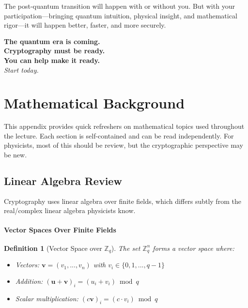 \documentclass[11pt,a4paper]{article}
\newtheorem{definition}{Definition}
\begin{document}
The post-quantum transition will happen with or without you. But with your participation—bringing quantum intuition, physical insight, and mathematical rigor—it will happen better, faster, and more securely.

\begin{center}
\Large
\textbf{The quantum era is coming.}\\[0.5em]
\textbf{Cryptography must be ready.}\\[0.5em]
\textbf{You can help make it ready.}\\[1em]
\textit{Start today.}
\end{center}

\appendix

\appendix

\section{Mathematical Background}
\label{app:math}

This appendix provides quick refreshers on mathematical topics used throughout the lecture. Each section is self-contained and can be read independently. For physicists, most of this should be review, but the cryptographic perspective may be new.

\subsection{Linear Algebra Review}
\label{app:linear-algebra}

Cryptography uses linear algebra over finite fields, which differs subtly from the real/complex linear algebra physicists know.

\paragraph{Vector Spaces Over Finite Fields}

\begin{definition}[Vector Space over $\mathbb{Z}_q$]
The set $\mathbb{Z}_q^n$ forms a vector space where:
\begin{itemize}
    \item Vectors: $\mathbf{v} = (v_1, ..., v_n)$ with $v_i \in \{0, 1, ..., q-1\}$
    \item Addition: $(\mathbf{u} + \mathbf{v})_i = (u_i + v_i) \bmod q$
    \item Scalar multiplication: $(c\mathbf{v})_i = (c \cdot v_i) \bmod q$
\end{itemize}
\end{definition}
\end{document}
